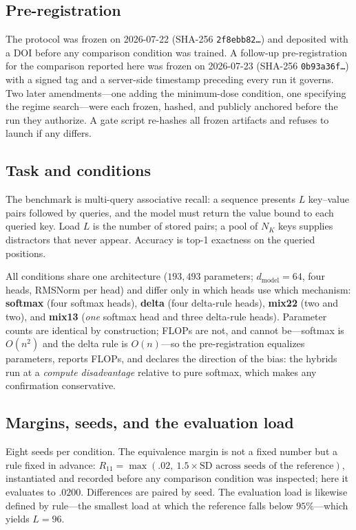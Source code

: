 \documentclass[jou,11pt,donotrepeattitle]{apa7}
\begin{document}
\subsection{Pre-registration}

The protocol was frozen on 2026-07-22 (SHA-256 \texttt{2f8ebb82\dots}) and deposited with a DOI
before any comparison condition was trained. A follow-up pre-registration for the comparison
reported here was frozen on 2026-07-23 (SHA-256 \texttt{0b93a36f\dots}) with a signed tag and a
server-side timestamp preceding every run it governs. Two later amendments---one adding the
minimum-dose condition, one specifying the regime search---were each frozen, hashed, and
publicly anchored before the run they authorize. A gate script re-hashes all frozen artifacts
and refuses to launch if any differs.

\subsection{Task and conditions}

The benchmark is multi-query associative recall: a sequence presents $L$ key--value pairs
followed by queries, and the model must return the value bound to each queried key. Load $L$
is the number of stored pairs; a pool of $N_K$ keys supplies distractors that never appear.
Accuracy is top-1 exactness on the queried positions.

All conditions share one architecture ($193{,}493$ parameters; $d_{\text{model}}=64$, four heads,
RMSNorm per head) and differ only in which heads use which mechanism: \textbf{softmax} (four softmax heads),
\textbf{delta} (four delta-rule heads), \textbf{mix22} (two and two), and \textbf{mix13}
(\emph{one} softmax head and three delta-rule heads). Parameter counts are identical by
construction; FLOPs are not, and cannot be---softmax is $O(n^2)$ and the delta rule is
$O(n)$---so the pre-registration equalizes parameters, reports FLOPs, and declares the
direction of the bias: the hybrids run at a \emph{compute disadvantage} relative to pure
softmax, which makes any confirmation conservative.

\subsection{Margins, seeds, and the evaluation load}

Eight seeds per condition. The equivalence margin is not a fixed number but a rule fixed in
advance: $R_{11} = \max(.02,\ 1.5\times \text{SD across seeds of the reference})$, instantiated
and recorded before any comparison condition was inspected; here it evaluates to $.0200$.
Differences are paired by seed. The evaluation load is likewise defined by rule---the smallest
load at which the reference falls below $95\%$---which yields $L=96$.
\end{document}
